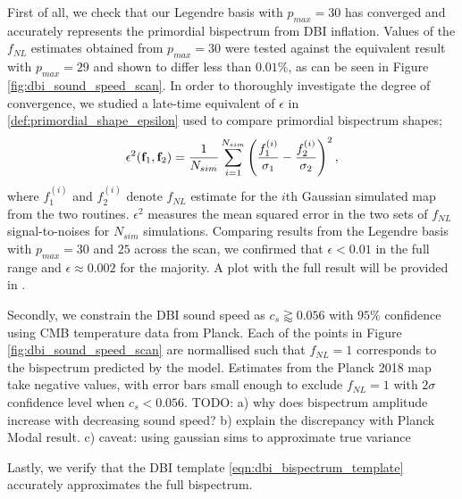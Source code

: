 First of all, we check that our Legendre basis with $p_{max}=30$ has converged and accurately represents the primordial bispectrum from DBI inflation. Values of the $f_{NL}$ estimates obtained from $p_{max}=30$ were tested against the equivalent result with $p_{max}=29$ and shown to differ less than $0.01\%$, as can be seen in Figure \ref{fig:dbi_sound_speed_scan}. In order to thoroughly investigate the degree of convergence, we studied a late-time equivalent of $\epsilon$ in  \eqref{def:primordial_shape_epsilon} used to compare primordial bispectrum shapes;
\begin{align}
	\epsilon^2 (\mathbf{f}_1, \mathbf{f}_2) = \frac{1}{N_{sim}}  \sum_{i=1}^{N_{sim}} \left( \frac{f^{(i)}_1}{\sigma_1} - \frac{f^{(i)}_2}{\sigma_2} \right)^2,
\end{align}
where $f^{(i)}_1$ and $f^{(i)}_2$ denote $f_{NL}$ estimate for the $i$th Gaussian simulated map from the two routines. $\epsilon^2$ measures the mean squared error in the two sets of $f_{NL}$ signal-to-noises for $N_{sim}$ simulations. Comparing results from the Legendre basis with $p_{max} = 30$ and $25$ across the scan, we confirmed that $\epsilon < 0.01$ in the full range and $\epsilon \approx 0.002$ for the majority. A plot with the full result will be provided in \cite{Sohn2021inprep}.

Secondly, we constrain the DBI sound speed as $c_s \gtrapprox 0.056$ with $95\%$ confidence using CMB temperature data from Planck. Each of the points in Figure \ref{fig:dbi_sound_speed_scan} are normallised such that $f_{NL}=1$ corresponds to the bispectrum predicted by the model. Estimates from the Planck 2018 map take negative values, with error bars small enough to exclude $f_{NL}=1$ with $2\sigma$ confidence level when $c_s < 0.056$. TODO:  a) why does bispectrum amplitude increase with decreasing sound speed? b) explain the discrepancy with Planck Modal result. c) caveat: using gaussian sims to approximate true variance

Lastly, we verify that the DBI template \eqref{eqn:dbi_bispectrum_template} accurately approximates the full bispectrum. 

